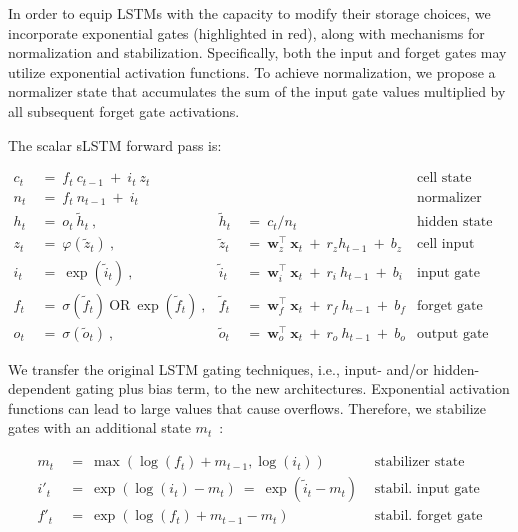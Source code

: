 In order to equip LSTMs with the capacity to modify their storage choices, we incorporate exponential gates (highlighted in red), along with mechanisms for normalization and stabilization. Specifically, both the input and forget gates may utilize exponential activation functions. To achieve normalization, we propose a normalizer state that accumulates the sum of the input gate values multiplied by all subsequent forget gate activations.

The scalar sLSTM forward pass is:

\begin{align}
\label{eq:slstmforward}
c_t \ &= \  f_t \ c_{t-1} \ + \ i_t \ z_t & & 
 &\text{cell state} \\
n_t \ &= \  f_t \ n_{t-1} \ + \ i_t  & & 
 &\text{normalizer state} \\
h_t \ &= \ o_t \ \tilde{h}_t \ ,
  &\tilde{h}_t \ &= \ c_t / n_t
&\text{hidden state} \\
z_t \ &= \ \varphi \left( \tilde{z}_t \right) \ , 
  &\tilde{z}_t \ &=  \ \mathbf{w}^\top_{z} \ \mathbf{x}_t \ + \
  r_{z}  h_{t-1} \ + \  b_{z}
  &\text{cell input} \\
i_t \ &= \ \!\exp \left( \tilde{i}_t  \right) \ , 
  &\tilde{i}_t \ &= \ \mathbf{w}^\top_{i} \ \mathbf{x}_t \ + \
  r_{i}  \ h_{t-1} \ + \  b_{i}
  &\text{input gate} \\
f_t \ &= \ \sigma \left(  \tilde{f}_t \right) \ \text{OR} \
\!\exp \left(  \tilde{f}_t \right) \ ,
  &\tilde{f}_t \ &= \ \mathbf{w}^\top_{f} \ \mathbf{x}_t  \ + \
  r_{f}  \ h_{t-1} \ + \  b_{f}
  &\text{forget gate} \\
o_t \ &= \ \sigma \left( \tilde{o}_t \right) \ , 
  &\tilde{o}_t  \ &= \ \mathbf{w}^\top_{o} \ \mathbf{x}_t \ + \
  r_{o}  \ h_{t-1} \ + \  b_{o}
  &\text{output gate} 
\end{align}

We transfer the original LSTM gating techniques, i.e., input- and/or hidden-dependent gating plus bias term, to the new architectures. Exponential activation functions can lead to large values that cause overflows. Therefore, we stabilize gates with an additional state \mbox{$m_t$~\citep{Milakov:18arxiv}}:

\begin{align}
\label{eq:slstmstabil}
m_t \ &= \ \max \left( \log ( f_t ) + m_{t-1} , \log ( i_t ) \right) &\text{stabilizer state} \\
i'_t \ &= \ \!\exp \left( \log \left ( i_t \right) - m_t \right) \ = \ \!\exp \left( \tilde{i}_t - m_t \right) \ \, 
  &\text{stabil. input gate} \\
f'_t \ &= \ \!\exp \left( \log \left( f_t \right) + m_{t-1} - m_t \right) \ \, 
  &\text{stabil. forget gate}
\end{align}

